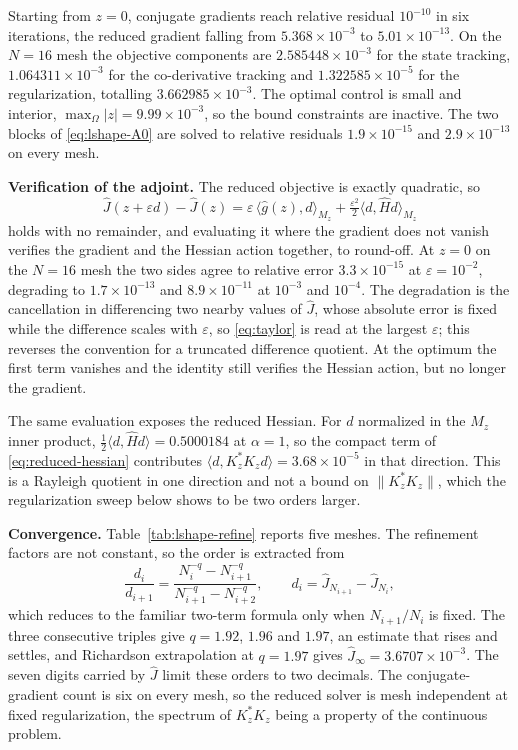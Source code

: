 \documentclass{article}
\newcommand{\ip}[2]{\langle #1,#2\rangle}
\newcommand{\norm}[1]{\lVert #1\rVert}
\begin{document}
Starting from $z=0$, conjugate gradients reach relative residual $10^{-10}$ in
six iterations, the reduced gradient falling from $5.368\times10^{-3}$ to
$5.01\times10^{-13}$. On the $N=16$ mesh the objective components are
$2.585448\times10^{-3}$ for the state tracking, $1.064311\times10^{-3}$ for
the co-derivative tracking and $1.322585\times10^{-5}$ for the
regularization, totalling $3.662985\times10^{-3}$. The optimal control is
small and interior, $\max_{\Omega}|z|=9.99\times10^{-3}$, so the bound
constraints are inactive. The two blocks of \eqref{eq:lshape-A0} are solved to
relative residuals $1.9\times10^{-15}$ and $2.9\times10^{-13}$ on every mesh.

\medskip
\noindent\textbf{Verification of the adjoint.}
The reduced objective is exactly quadratic, so
\begin{equation}\label{eq:taylor}
  \widehat J(z+\varepsilon d)-\widehat J(z)
  =\varepsilon\,\ip{\widehat g(z)}{d}_{M_{z}}
  +\tfrac{\varepsilon^{2}}{2}\ip{d}{\widehat Hd}_{M_{z}}
\end{equation}
holds with no remainder, and evaluating it where the gradient does not vanish
verifies the gradient and the Hessian action together, to round-off. At $z=0$
on the $N=16$ mesh the two sides agree to relative error $3.3\times10^{-15}$
at $\varepsilon=10^{-2}$, degrading to $1.7\times10^{-13}$ and
$8.9\times10^{-11}$ at $10^{-3}$ and $10^{-4}$. The degradation is the
cancellation in differencing two nearby values of $\widehat J$, whose absolute
error is fixed while the difference scales with $\varepsilon$, so
\eqref{eq:taylor} is read at the largest $\varepsilon$; this reverses the
convention for a truncated difference quotient. At the optimum the first term
vanishes and the identity still verifies the Hessian action, but no longer the
gradient.

The same evaluation exposes the reduced Hessian. For $d$ normalized in the
$M_{z}$ inner product, $\tfrac12\ip{d}{\widehat Hd}=0.5000184$ at $\alpha=1$,
so the compact term of \eqref{eq:reduced-hessian} contributes
$\ip{d}{K_{z}^{*}K_{z}d}=3.68\times10^{-5}$ in that direction. This is a
Rayleigh quotient in one direction and not a bound on $\norm{K_{z}^{*}K_{z}}$,
which the regularization sweep below shows to be two orders larger.

\medskip
\noindent\textbf{Convergence.}
Table~\ref{tab:lshape-refine} reports five meshes. The refinement factors are
not constant, so the order is extracted from
\begin{equation}\label{eq:order}
  \frac{d_{i}}{d_{i+1}}
  =\frac{N_{i}^{-q}-N_{i+1}^{-q}}{N_{i+1}^{-q}-N_{i+2}^{-q}},
  \qquad d_{i}=\widehat J_{N_{i+1}}-\widehat J_{N_{i}},
\end{equation}
which reduces to the familiar two-term formula only when $N_{i+1}/N_{i}$ is
fixed. The three consecutive triples give $q=1.92$, $1.96$ and $1.97$, an
estimate that rises and settles, and Richardson extrapolation at $q=1.97$
gives $\widehat J_{\infty}=3.6707\times10^{-3}$. The seven digits carried by
$\widehat J$ limit these orders to two decimals. The conjugate-gradient count
is six on every mesh, so the reduced solver is mesh independent at fixed
regularization, the spectrum of $K_{z}^{*}K_{z}$ being a property of the
continuous problem.
\end{document}
